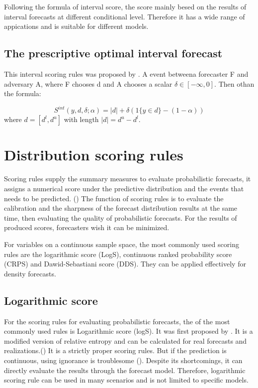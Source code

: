 \documentclass{monashthesis}
\theoremstyle{definition}
\theoremstyle{definition}
\theoremstyle{definition}
\theoremstyle{remark}
\begin{document}
Following the formula of interval score, the score mainly besed on the
results of interval forecasts at different conditional level. Therefore
it has a wide range of appications and is suitable for different models.

\subsection{The prescriptive optimal interval
forecast}\label{the-prescriptive-optimal-interval-forecast}

This interval scoring rules was proposed by \textcite{RDSS18}. A event
betweena forecaster F and adversary A, where F chooses d and A chooses a
scalar \(\delta\in[-\infty,0]\). Then othan the formula:

\[
  S^{int}(y,d,\delta;\alpha)=|d|+\delta(1\{y\in{d}\}-(1-\alpha))
\] where \(d=[d^l,d^u]\) with length \(|d|=d^u-d^l\).

\section{Distribution scoring rules}\label{distribution-scoring-rules}

Scoring rules supply the summary measures to evaluate probabilistic
forecasts, it assigns a numerical score under the predictive
distribution and the events that needs to be predicted.
(\textcite{GBR07}) The function of scoring rules is to evaluate the
calibration and the sharpness of the forecast distribution results at
the same time, then evaluating the quality of probabilistic forecasts.
For the results of produced scores, forecasters wish it can be
minimized.

For variables on a continuous sample space, the most commonly used
scoring rules are the logarithmic score (LogS), continuous ranked
probability score (CRPS) and Dawid-Sebastiani score (DDS). They can be
applied effectively for density forecasts.

\subsection{Logarithmic score}\label{logarithmic-score}

For the scoring rules for evaluating probabilistic forecasts, the of the
most commonly used rules is Logarithmic score (logS). It was first
proposed by \textcite{G52}. It is a modified version of relative entropy
and can be calculated for real forecasts and
realizations.(\textcite{RS02}) It is a strictly proper scoring rules.
But if the prediction is continuous, using ignorance is troublesome
(\textcite{P10}). Despite its shortcomings, it can directly evaluate the
results through the forecast model. Therefore, logarithmic scoring rule
can be used in many scenarios and is not limited to specific models.
\end{document}
